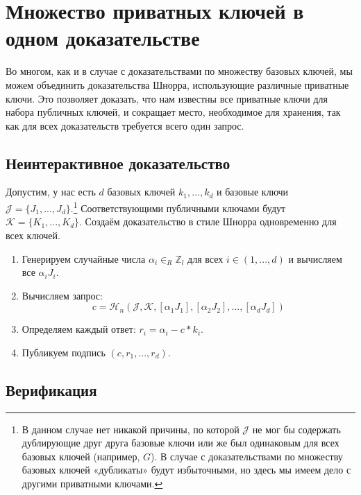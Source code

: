 \section{Множество приватных ключей в одном доказательстве}
\label{sec:multiple_private_keys_in_one_proof}

Во многом, как и в случае с доказательствами по множеству базовых ключей, мы можем объединить доказательства Шнорра, использующие различные приватные ключи. Это позво\-ляет доказать, что нам известны все приватные ключи для набора публичных ключей, и сокращает место, необходимое для хранения, так как для всех доказательств требуется всего один запрос.


\subsection*{Неинтерактивное доказательство}

Допустим, у нас есть $d$ базовых ключей $k_1,...,k_d$ и базовые ключи $\mathcal{J} = \{J_1,...,J_d\}$.\footnote{В данном случае нет никакой причины, по которой $\mathcal{J}$ не мог бы содержать дублирующие друг друга базовые ключи или же был одинаковым для всех базовых ключей (например, $G$). В случае с доказательствами по множеству базовых ключей «дубликаты» будут избыточными, но здесь мы имеем дело с другими приватными ключами.} Соответ\-ствующими публичными ключами будут $\mathcal{K} = \{K_1,...,K_d\}$. Создаём доказательство в стиле Шнорра одновременно для всех ключей.

\begin{enumerate}
	\item Генерируем случайные числа $\alpha_i \in_R \mathbb{Z}_l$ для всех $i \in (1,...,d)$ и вычисляем все $\alpha_i J_i$.
	\item Вычисляем запрос:\vspace{.175cm}
	\[c = \mathcal{H}_n(\mathcal{J},\mathcal{K},[\alpha_1 J_1],[\alpha_2 J_2],...,[\alpha_d J_d])\]
	\item Определяем каждый ответ: $r_i = \alpha_i - c*k_i$.
	\item Публикуем подпись $(c, r_1,...,r_d)$.
\end{enumerate}


\subsection*{Верификация}

